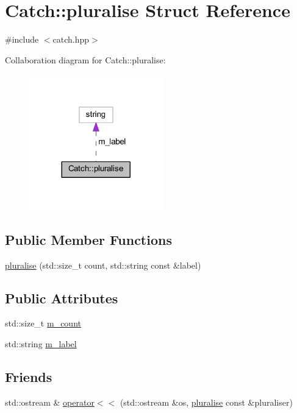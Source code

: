 \hypertarget{struct_catch_1_1pluralise}{}\section{Catch\+:\+:pluralise Struct Reference}
\label{struct_catch_1_1pluralise}


{\ttfamily \#include $<$catch.\+hpp$>$}



Collaboration diagram for Catch\+:\+:pluralise\+:\nopagebreak
\begin{figure}[H]
\begin{center}
\leavevmode
\includegraphics[width=164pt]{struct_catch_1_1pluralise__coll__graph}
\end{center}
\end{figure}
\subsection*{Public Member Functions}
\begin{DoxyCompactItemize}
\item 
\hyperlink{struct_catch_1_1pluralise_a5c55e22de2416cfe416edf715c6b9234}{pluralise} (std\+::size\+\_\+t count, std\+::string const \&label)
\end{DoxyCompactItemize}
\subsection*{Public Attributes}
\begin{DoxyCompactItemize}
\item 
std\+::size\+\_\+t \hyperlink{struct_catch_1_1pluralise_a4dce2fa13ec6f00fac09b2418265441e}{m\+\_\+count}
\item 
std\+::string \hyperlink{struct_catch_1_1pluralise_a8849cbdd3f11ebe7747597c8644e8793}{m\+\_\+label}
\end{DoxyCompactItemize}
\subsection*{Friends}
\begin{DoxyCompactItemize}
\item 
std\+::ostream \& \hyperlink{struct_catch_1_1pluralise_aa7dac6b165514c1f85e0695d678fdef5}{operator$<$$<$} (std\+::ostream \&os, \hyperlink{struct_catch_1_1pluralise}{pluralise} const \&pluraliser)
\end{DoxyCompactItemize}


